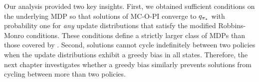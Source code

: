 

Our analysis provided two key insights.
First, we obtained sufficient conditions on the underlying MDP so that
solutions of MC-O-PI converge to $q_{{\pi}_*}$ with probability one for \textit{any} update distributions that satisfy the modified Robbins-Monro conditions.
These conditions define a strictly larger class of MDPs than those covered by \cite{Wang2022OnLearning}.
Second, solutions cannot cycle indefinitely between two policies when the update distributions exhibit a greedy bias in all states. Therefore, the next chapter investigates whether a greedy bias similarly prevents solutions from cycling between more than two policies.






\clearpage





